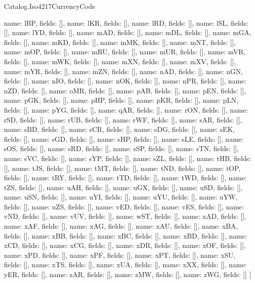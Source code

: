 \begin{lexlean}{Catalog.Iso4217CurrencyCode}
\begin{semanticmodule}
{    {name: lBP, fields: []},
    {name: lKR, fields: []},
    {name: lRD, fields: []},
    {name: lSL, fields: []},
    {name: lYD, fields: []},
    {name: mAD, fields: []},
    {name: mDL, fields: []},
    {name: mGA, fields: []},
    {name: mKD, fields: []},
    {name: mMK, fields: []},
    {name: mNT, fields: []},
    {name: mOP, fields: []},
    {name: mRU, fields: []},
    {name: mUR, fields: []},
    {name: mVR, fields: []},
    {name: mWK, fields: []},
    {name: mXN, fields: []},
    {name: mXV, fields: []},
    {name: mYR, fields: []},
    {name: mZN, fields: []},
    {name: nAD, fields: []},
    {name: nGN, fields: []},
    {name: nIO, fields: []},
    {name: nOK, fields: []},
    {name: nPR, fields: []},
    {name: nZD, fields: []},
    {name: oMR, fields: []},
    {name: pAB, fields: []},
    {name: pEN, fields: []},
    {name: pGK, fields: []},
    {name: pHP, fields: []},
    {name: pKR, fields: []},
    {name: pLN, fields: []},
    {name: pYG, fields: []},
    {name: qAR, fields: []},
    {name: rON, fields: []},
    {name: rSD, fields: []},
    {name: rUB, fields: []},
    {name: rWF, fields: []},
    {name: sAR, fields: []},
    {name: sBD, fields: []},
    {name: sCR, fields: []},
    {name: sDG, fields: []},
    {name: sEK, fields: []},
    {name: sGD, fields: []},
    {name: sHP, fields: []},
    {name: sLE, fields: []},
    {name: sOS, fields: []},
    {name: sRD, fields: []},
    {name: sSP, fields: []},
    {name: sTN, fields: []},
    {name: sVC, fields: []},
    {name: sYP, fields: []},
    {name: sZL, fields: []},
    {name: tHB, fields: []},
    {name: tJS, fields: []},
    {name: tMT, fields: []},
    {name: tND, fields: []},
    {name: tOP, fields: []},
    {name: tRY, fields: []},
    {name: tTD, fields: []},
    {name: tWD, fields: []},
    {name: tZS, fields: []},
    {name: uAH, fields: []},
    {name: uGX, fields: []},
    {name: uSD, fields: []},
    {name: uSN, fields: []},
    {name: uYI, fields: []},
    {name: uYU, fields: []},
    {name: uYW, fields: []},
    {name: uZS, fields: []},
    {name: vED, fields: []},
    {name: vES, fields: []},
    {name: vND, fields: []},
    {name: vUV, fields: []},
    {name: wST, fields: []},
    {name: xAD, fields: []},
    {name: xAF, fields: []},
    {name: xAG, fields: []},
    {name: xAU, fields: []},
    {name: xBA, fields: []},
    {name: xBB, fields: []},
    {name: xBC, fields: []},
    {name: xBD, fields: []},
    {name: xCD, fields: []},
    {name: xCG, fields: []},
    {name: xDR, fields: []},
    {name: xOF, fields: []},
    {name: xPD, fields: []},
    {name: xPF, fields: []},
    {name: xPT, fields: []},
    {name: xSU, fields: []},
    {name: xTS, fields: []},
    {name: xUA, fields: []},
    {name: xXX, fields: []},
    {name: yER, fields: []},
    {name: zAR, fields: []},
    {name: zMW, fields: []},
    {name: zWG, fields: []}
  ]
}
\end{semanticmodule}
\end{lexlean}

